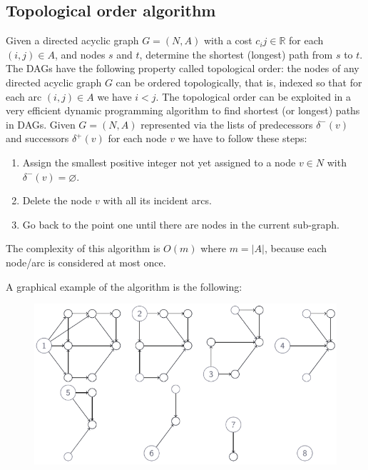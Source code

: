 \documentclass[12pt, a4paper]{report}
\begin{document}
    \subsection{Topological order algorithm}
    Given a directed acyclic graph $G = (N,A)$ with a cost $c_ij \in \mathbb{R}$ for each $(i,j) \in A$, and nodes $s$ and $t$, determine the shortest (longest) path from $s$ to $t$. 
    The DAGs have the following property called topological order: the nodes of any directed acyclic graph $G$ can be ordered topologically, that is, indexed so that for each arc $(i,j) \in A$ we have $i < j$. 
    The topological order can be exploited in a very efficient dynamic programming algorithm to find shortest (or longest) paths in DAGs. Given $G = (N,A)$ represented via the lists of predecessors
    $\delta^{-}(v)$ and successors $\delta^{+}(v)$ for each node $v$ we have to follow these steps: 
    \begin{enumerate}
        \item Assign the smallest positive integer not yet assigned to a node $v \in N$ with $\delta^{-}(v)=\varnothing$. 
        \item Delete the node $v$ with all its incident arcs. 
        \item Go back to the point one until there are nodes in the current sub-graph. 
    \end{enumerate}
    The complexity of this algorithm is $O(m)$ where $m = \left\lvert A \right\rvert $, because each node/arc is considered at most once. 
    \begin{example}
        A graphical example of the algorithm is the following: 
        \begin{figure}[H]
            \centering
            \includegraphics[width=0.8\linewidth]{images/spath.png}
        \end{figure}
    \end{example}
\end{document}
